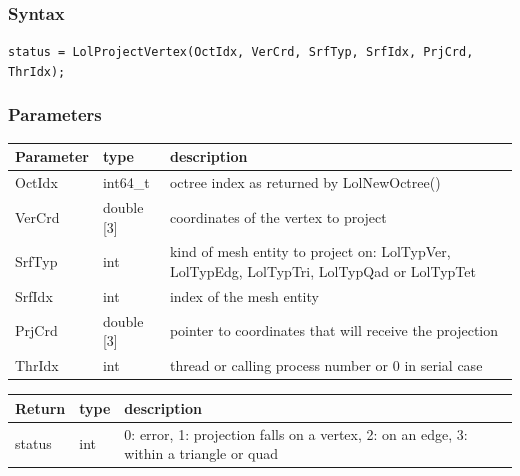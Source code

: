 \documentclass[a4paper,12pt]{article}
\begin{document}
\subsubsection*{Syntax}
{\tt status = LolProjectVertex(OctIdx, VerCrd, SrfTyp, SrfIdx, PrjCrd, ThrIdx);}

\subsubsection*{Parameters}
\begin{tabular}{|m{3cm}|m{2cm}|m{8.5cm}|}
\hline
Parameter  & type       & description \\
\hline
OctIdx     & int64\_t   & octree index as returned by LolNewOctree() \\
\hline
VerCrd     & double [3] & coordinates of the vertex to project \\
\hline
SrfTyp     & int        & kind of mesh entity to project on: LolTypVer, LolTypEdg, LolTypTri, LolTypQad or LolTypTet \\
\hline
SrfIdx     & int        & index of the mesh entity \\
\hline
PrjCrd     & double [3] & pointer to coordinates that will receive the projection \\
\hline
ThrIdx     & int        & thread or calling process number or 0 in serial case \\
\hline
\end{tabular}

\medskip

\begin{tabular}{|m{3cm}|m{2cm}|m{8.5cm}|}
\hline
Return     & type   & description \\
\hline
status     & int    & 0: error, 1: projection falls on a vertex, 2: on an edge, 3: within a triangle or quad \\
\hline
\end{tabular}
\end{document}
